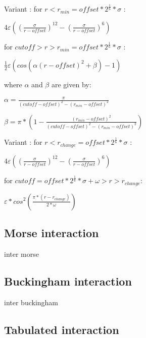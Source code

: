 
Variant : for $r < r_{min} = offset * 2^{\frac{1}{6}} *
\sigma$ :
\begin{center}
$4\varepsilon((\frac{\sigma}{r-offset})^{12}-(\frac{\sigma}{r-offset})^6)$
\end{center}
for $cutoff > r > r_{min} = offset * 2^{\frac{1}{6}} * \sigma$ :
\begin{center}
$\frac{1}{2}\varepsilon(cos(\alpha(r-offset)^2 + \beta)-1)$
\end{center}
where $\alpha$ and $\beta$ are given by:

$\alpha = \frac{\pi}{(cutoff-offset)^2-(r_{min}-offset)^2}$

$\beta = \pi * (1 -
\frac{(r_{min}-offset)^2}{(cutoff-offset)^2-(r_{min}-offset)^2})$

Variant :
for $r < r_{change} = offset * 2^{\frac{1}{6}} * \sigma$ :
\begin{center}
$4 \varepsilon((\frac{\sigma}{r-offset})^{12}-(\frac{\sigma}{r-offset})^6)$
\end{center}
for $cutoff = offset * 2^{\frac{1}{6}} * \sigma + \omega > r > r_{change}$:
\begin{center}
$\varepsilon * cos^2(\frac{\pi * (r - r_{change})}{2 * \omega})$
\end{center}

\subsection{Morse interaction}

\begin{essyntax}
  inter   morse
     
\end{essyntax}

\subsection{Buckingham interaction}

\begin{essyntax}
  inter   buckingham
      
    
\end{essyntax}

\subsection{Tabulated interaction}

